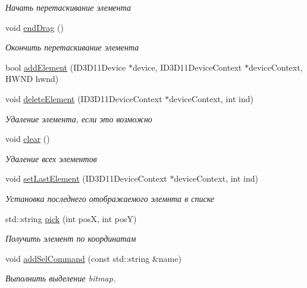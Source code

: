 \begin{DoxyCompactItemize}
\begin{DoxyCompactList}\small\item\em Начать перетаскивание элемента \end{DoxyCompactList}\item 
void \hyperlink{class_list_element_class_ab592a2b28ec7af2aaff955c5d4f68a33}{end\+Drag} ()
\begin{DoxyCompactList}\small\item\em Окончить перетаскивание элемента \end{DoxyCompactList}\item 
bool \hyperlink{class_list_element_class_a79d3904e6f0b533bada46b9e55ae5ede}{add\+Element} (I\+D3\+D11\+Device $\ast$device, I\+D3\+D11\+Device\+Context $\ast$device\+Context, H\+W\+ND hwnd)
\item 
void \hyperlink{class_list_element_class_a5cef68e71760862404d66baf55e526af}{delete\+Element} (I\+D3\+D11\+Device\+Context $\ast$device\+Context, int ind)
\begin{DoxyCompactList}\small\item\em Удаление элемента, если это возможно \end{DoxyCompactList}\item 
void \hyperlink{class_list_element_class_a3c18a56481ec0a07b834eeccf111ea95}{clear} ()
\begin{DoxyCompactList}\small\item\em Удаление всех элементов \end{DoxyCompactList}\item 
void \hyperlink{class_list_element_class_adc391c85ee2c2cca96582192fbe7ea0a}{set\+Last\+Element} (I\+D3\+D11\+Device\+Context $\ast$device\+Context, int ind)
\begin{DoxyCompactList}\small\item\em Установка последнего отображаемого элемнта в списке \end{DoxyCompactList}\item 
std\+::string \hyperlink{class_list_element_class_a7db3d5f126aa03b9f220648c60a120fa}{pick} (int posX, int posY)
\begin{DoxyCompactList}\small\item\em Получить элемент по координатам \end{DoxyCompactList}\item 
void \hyperlink{class_list_element_class_ad76028165b37c10e2315fa0c678d51fc}{add\+Sel\+Command} (const std\+::string \&name)
\begin{DoxyCompactList}\small\item\em Выполнить выделение bitmap. \end{DoxyCompactList}\item 

\end{DoxyCompactItemize}
